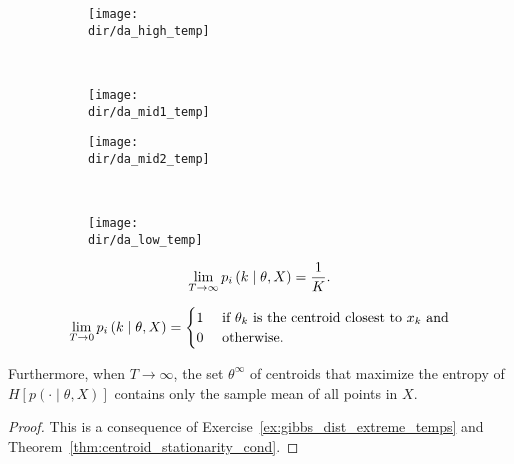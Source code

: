 \begin{figure}
    \centering
    \begin{subfigure}[b]{0.4\textwidth}
        \texttt{[image: \\dir/da\_high\_temp]}
        \caption{}
        \label{fig:da_high_temp}
    \end{subfigure}
    ~ %
    \begin{subfigure}[b]{0.4\textwidth}
        \texttt{[image: \\dir/da\_mid1\_temp]}
        \caption{}
        \label{fig:da_mid1_temp}
    \end{subfigure}
    
    \begin{subfigure}[b]{0.4\textwidth}
        \texttt{[image: \\dir/da\_mid2\_temp]}
        \caption{}
        \label{fig:da_mid2_temp}
    \end{subfigure}
    ~ %
    \begin{subfigure}[b]{0.4\textwidth}
        \texttt{[image: \\dir/da\_low\_temp]}
        \caption{}
        \label{fig:da_low_temp}
    \end{subfigure}
    \caption{}\label{fig:da_phase_trans}
\end{figure}

\begin{theorem}
\begin{equation}
\lim_{T \to \infty} p_{i} \left(k\mid \theta, X\right) = \frac{1}{K}.
\end{equation}

\begin{equation}
\lim_{T \to 0} p_{i} \left(k\mid \theta, X\right) = \begin{cases}
1 & \text{ if $\theta_k$ is the centroid closest to $x_k$ and}\\
0 & \text{ otherwise}.
\end{cases}
\end{equation}

Furthermore, when $T \to \infty$, the set $\theta^\infty$ of centroids that maximize the entropy of $H\left[p\left(\cdot \mid \theta, X\right)\right]$ contains only the sample mean of all points in $X$.
\label{lem:da_extreme_temps}
\end{theorem}

\begin{proof}
This is a consequence of Exercise~\ref{ex:gibbs_dist_extreme_temps} and Theorem~\ref{thm:centroid_stationarity_cond}.
\end{proof}

